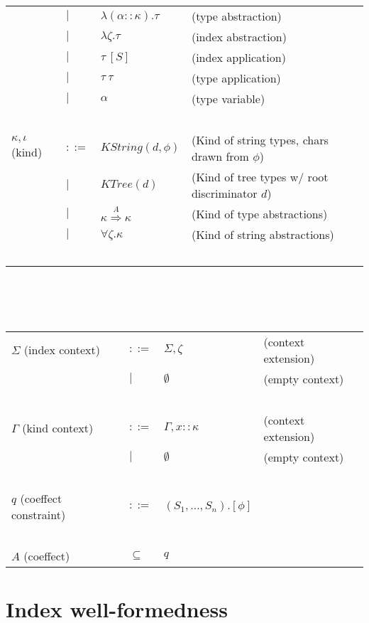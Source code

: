 \documentclass{article}
\begin{document}
\begin{tabular}{llll}
       & $\mid$ & $\lambda (\alpha :: \kappa). \tau$ & (type abstraction) \\
       & $\mid$ & $\lambda \zeta. \tau$ & (index abstraction) \\
       & $\mid$ & $\tau~[S]$ & (index application) \\
       & $\mid$ & $\tau~\tau$ & (type application) \\
       & $\mid$ & $\alpha$ & (type variable) \\~\\
$\kappa, \iota$ (kind) & $::=$ & $\mathit{KString}(d,\phi)$ & (Kind of string types, chars drawn from $\phi$) \\
                       & $\mid$ & $\mathit{KTree}(d)$ & (Kind of tree types w/ root discriminator $d$) \\
                       & $\mid$ & $\kappa \overset{A}{\Rightarrow} \kappa$ & (Kind of type abstractions) \\
                       & $\mid$ & $\forall \zeta. \kappa$ & (Kind of string abstractions) \\~\\
\end{tabular}\\~\\~\\
\begin{tabular}{llll}
$\Sigma$ (index context) & $::=$ & $\Sigma,\zeta$ & (context extension) \\
                         & $\mid$ & $\emptyset$ & (empty context) \\~\\
$\Gamma$ (kind context) & $::=$ & $\Gamma,x :: \kappa$ & (context extension) \\
                           & $\mid$ & $\emptyset$ & (empty context) \\~\\
$q$ (coeffect constraint)  & $::=$ & $(S_1,\ldots,S_n).[\phi]$ & ~ \\~\\ 
$A$ (coeffect) & $\subseteq$ & $q$ & ~ 
\end{tabular}

\section*{Index well-formedness}
\end{document}

